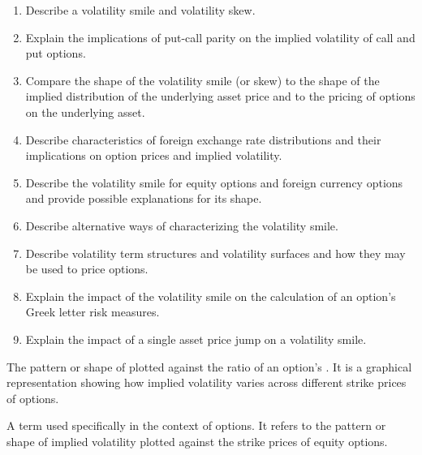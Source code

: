 
\begin{mrkeybox}[title={Learning objectives in this reading}]
\small
\begin{enumerate}[label=\textbf{\alph*.},leftmargin=1.7em]
\item Describe a volatility smile and volatility skew.
\item Explain the implications of put-call parity on the implied volatility of call and put
      options.
\item Compare the shape of the volatility smile (or skew) to the shape of the implied
      distribution of the underlying asset price and to the pricing of options on the underlying
      asset.
\item Describe characteristics of foreign exchange rate distributions and their implications on
      option prices and implied volatility.
\item Describe the volatility smile for equity options and foreign currency options and provide
      possible explanations for its shape.
\item Describe alternative ways of characterizing the volatility smile.
\item Describe volatility term structures and volatility surfaces and how they may be used to
      price options.
\item Explain the impact of the volatility smile on the calculation of an option's Greek letter
      risk measures.
\item Explain the impact of a single asset price jump on a volatility smile.
\end{enumerate}
\end{mrkeybox}


\begin{mrdefbox}[title={Volatility smile}]
The pattern or shape of  plotted against the ratio of an option's
. It is a graphical representation showing
how implied volatility varies across different strike prices of options.
\end{mrdefbox}

\begin{mrdefbox}[title={Volatility skew}]
A term used specifically in the context of  options. It refers to the pattern or
shape of implied volatility plotted against the strike prices of equity options.
\end{mrdefbox}

